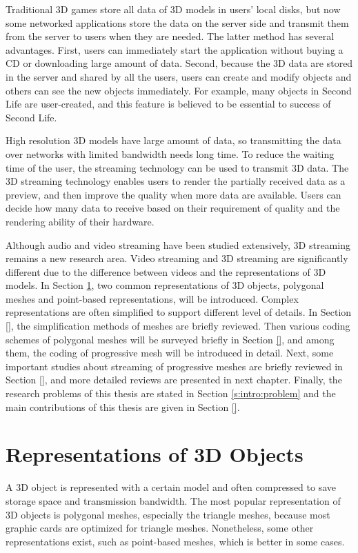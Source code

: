 \documentclass[11pt, a4paper]{report}
\begin{document}
    Traditional 3D games store all data of 3D models in users’ local disks, 
    but now some networked applications store the data on the server side 
    and transmit them from the server to users when they are needed. 
    The latter method has several advantages. 
    First, users can immediately start the application without buying a CD
    or downloading large amount of data. 
    Second, because the 3D data are stored in the server and shared by all the users, 
    users can create and modify objects and others can see the new objects immediately. 
    For example, many objects in Second Life are user-created, 
    and this feature is believed to be essential to success of Second Life. 

    High resolution 3D models have large amount of data, 
    so transmitting the data over networks with limited bandwidth needs long time. 
    To reduce the waiting time of the user, 
    the streaming technology can be used to transmit 3D data. 
    The 3D streaming technology enables users to render the partially received data as a preview, 
    and then improve the quality when more data are available. 
    Users can decide how many data to receive based on their requirement of quality
    and the rendering ability of their hardware. 

    Although audio and video streaming have been studied extensively, 
    3D streaming remains a new research area. 
    Video streaming and 3D streaming are significantly different
    due to the difference between videos and the representations of 3D models. 
    In Section \ref{s:intro:representation}, two common representations of 3D objects, 
    polygonal meshes and point-based representations, will be introduced. 
    Complex representations are often simplified to support different level of details. 
    In Section \ref{}, the simplification methods of meshes are briefly reviewed. 
    Then various coding schemes of polygonal meshes will be surveyed briefly in Section \ref{}, 
    and among them, the coding of progressive mesh will be introduced in detail. 
    Next, some important studies about streaming of progressive meshes
    are briefly reviewed in Section \ref{}, and more detailed reviews are presented in next chapter.
    Finally, the research problems of this thesis are stated in Section \ref{s:intro:problem}
    and the main contributions of this thesis are given in Section \ref{}.

    \section{Representations of 3D Objects}
    \label{s:intro:representation}
    A 3D object is represented with a certain model and often compressed
    to save storage space and transmission bandwidth. 
    The most popular representation of 3D objects is polygonal meshes, 
    especially the triangle meshes, because most graphic cards are optimized for triangle meshes. 
    Nonetheless, some other representations exist, 
    such as point-based meshes, which is better in some cases.
\end{document}
